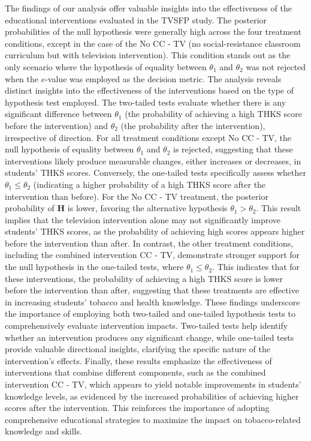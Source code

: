 \documentclass[AMA,Times1COL]{WileyNJDv5} %
\begin{document}
The findings of our analysis offer valuable insights into the effectiveness of the educational interventions evaluated in the TVSFP study. The posterior probabilities of the null hypothesis were generally high across the four treatment conditions, except in the case of the No CC - TV (no social-resistance classroom curriculum but with television intervention). This condition stands out as the only scenario where the hypothesis of equality between $\theta_1$ and $\theta_2$ was not rejected when the $e$-value was employed as the decision metric. The analysis reveals distinct insights into the effectiveness of the interventions based on the type of hypothesis test employed. The two-tailed tests evaluate whether there is any significant difference between $\theta_1$ (the probability of achieving a high THKS score before the intervention) and $\theta_2$ (the probability after the intervention), irrespective of direction. For all treatment conditions except No CC - TV, the null hypothesis of equality between $\theta_1$ and $\theta_2$ is rejected, suggesting that these interventions likely produce measurable changes, either increases or decreases, in students' THKS scores. Conversely, the one-tailed tests specifically assess whether $\theta_1 \leq \theta_2$ (indicating a higher probability of a high THKS score after the intervention than before). For the No CC - TV treatment, the posterior probability of \textbf{H} is lower, favoring the alternative hypothesis $\theta_1 > \theta_2$. This result implies that the television intervention alone may not significantly improve students’ THKS scores, as the probability of achieving high scores appears higher before the intervention than after. In contrast, the other treatment conditions, including the combined intervention CC - TV, demonstrate stronger support for the null hypothesis in the one-tailed tests, where $\theta_1 \leq \theta_2$. This indicates that for these interventions, the probability of achieving a high THKS score is lower before the intervention than after, suggesting that these treatments are effective in increasing students’ tobacco and health knowledge. These findings underscore the importance of employing both two-tailed and one-tailed hypothesis tests to comprehensively evaluate intervention impacts. Two-tailed tests help identify whether an intervention produces any significant change, while one-tailed tests provide valuable directional insights, clarifying the specific nature of the intervention's effects. Finally, these results emphasize the effectiveness of interventions that combine different components, such as the combined intervention CC - TV, which appears to yield notable improvements in students' knowledge levels, as evidenced by the increased probabilities of achieving higher scores after the intervention. This reinforces the importance of adopting comprehensive educational strategies to maximize the impact on tobacco-related knowledge and skills.
\end{document}
